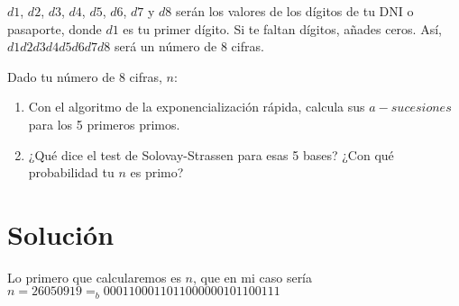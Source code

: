 	$d1$, $d2$, $d3$, $d4$, $d5$, $d6$, $d7$ y $d8$ serán los valores de los dígitos de tu DNI o pasaporte, donde $d1$
	es tu primer dígito. Si te faltan dígitos, añades ceros. Así, $d1d2d3d4d5d6d7d8$ será un número de 8 cifras.
	
	Dado tu número de 8 cifras, $n$:
	\begin{enumerate}
		\item Con el algoritmo de la exponencialización rápida, calcula sus $a-sucesiones$ para los 5 primeros primos.
		\item ¿Qué dice el test de Solovay-Strassen para esas 5 bases? ¿Con qué probabilidad tu $n$ es primo?
	\end{enumerate}

\section*{Solución}
	Lo primero que calcularemos es $n$, que en mi caso sería $n = 26050919 =_b 0001 1000 1101 1000 0001 0110 0111$
	

